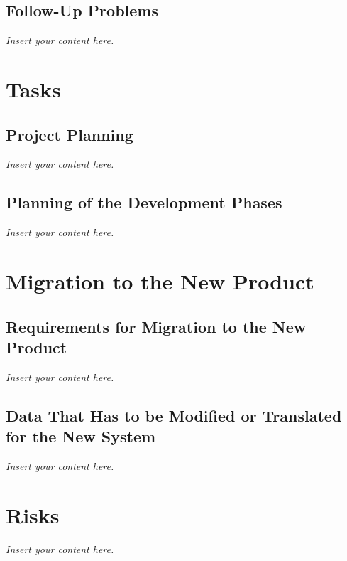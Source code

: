 \documentclass[a4paper, 12pt,twoside]{article}
\newcommand{\lips}{\textit{Insert your content here.}}
\begin{document}
\subsection{Follow-Up Problems}
\lips

\section{Tasks}
\subsection{Project Planning}
\lips
\subsection{Planning of the Development Phases}
\lips

\section{Migration to the New Product}
\subsection{Requirements for Migration to the New Product}
\lips
\subsection{Data That Has to be Modified or Translated for the New System}
\lips

\section{Risks}
\lips
\end{document}
